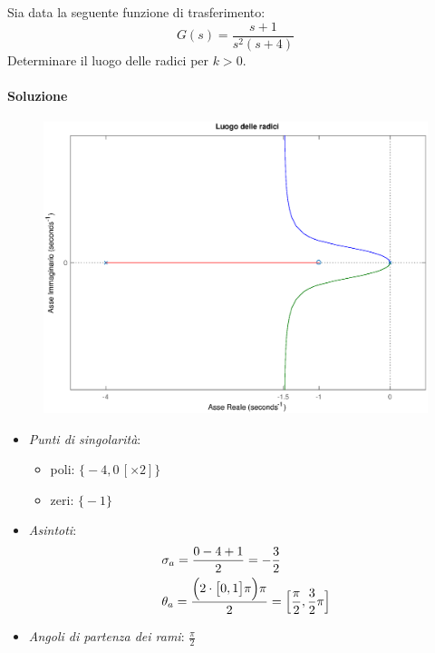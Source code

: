 \begin{esercizio}
Sia data la seguente funzione di trasferimento:
\[
	G(s) = \frac{s+1}{s^2 (s+4)}
\]
Determinare il luogo delle radici per \(k>0\).

\paragraph{Soluzione}

\begin{figure}[ht]
	\centering
	\includegraphics[scale=.6]{mod1/assets/rl_ex35}
\end{figure}

\begin{itemize}
	\item \emph{Punti di singolarità}:
		\begin{itemize}
			\item poli: \(\bigl\{ -4, 0\,[\times 2] \bigr\}\)
			\item zeri: \(\bigl\{ -1 \bigr\}\)
		\end{itemize}
	\item \emph{Asintoti}:
		\begin{align*}
			& \sigma_a = \frac{0-4+1}{2} = -\frac{3}{2} \\
			& \theta_a = \frac{\Bigl( 2 \cdot \bigl[ 0,1 \bigr] \pi \Bigr) \pi}{2} = \Bigl[ \frac{\pi}{2}, \frac{3}{2}\pi \Bigr]
		\end{align*}
	\item \emph{Angoli di partenza dei rami}: \(\frac{\pi}{2}\)
\end{itemize}
\end{esercizio}

